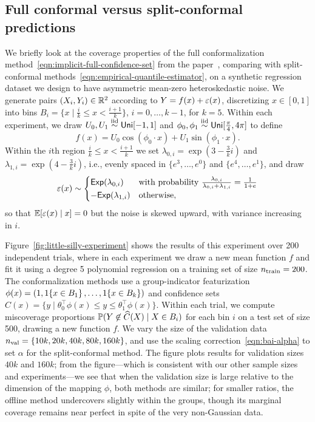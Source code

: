 \documentclass{article}
\begin{document}
\subsection{Full conformal versus split-conformal predictions}
\label{sec:offline-sin-simulation}

We briefly look at the coverage properties of the full conformalization
method~\eqref{eqn:implicit-full-confidence-set} from the
paper~\citep{GibbsChCa25}, comparing with split-conformal
methods~\eqref{eqn:empirical-quantile-estimator}, on a synthetic regression
dataset we design to have asymmetric mean-zero heteroskedastic noise.
%
We generate pairs $(X_i, Y_i) \in \mathbb{R}^2$ according to
$Y = f(x) + \varepsilon(x)$,
discretizing $x \in [0, 1]$ into bins
$B_i = \{x \mid \frac{i}{k} \le x < \frac{i + 1}{k}\}$,
$i = 0, \ldots, k - 1$, for $k = 5$.
%
Within each experiment, we
draw $U_0, U_1 \stackrel{\rm iid}{\sim} \mathsf{Uni}[-1, 1]$ and
$\phi_0, \phi_1 \stackrel{\rm iid}{\sim} \mathsf{Uni}[\frac{\pi}{4}, 4 \pi]$
to define
\begin{equation*}
  f(x) = U_0 \cos(\phi_0 \cdot x)
  + U_1 \sin(\phi_1 \cdot x).
\end{equation*}
Within the $i$th region $\frac{i}{k} \le x < \frac{i + 1}{k}$ we
set $\lambda_{0,i} = \exp(3 - \frac{3}{k} i)$ and
$\lambda_{1,i} = \exp(4 - \frac{3}{k} i)$, i.e.,
evenly spaced in $\{e^{3}, \ldots, e^0\}$ and $\{e^{4}, \ldots, e^{1}\}$,
and draw
\begin{equation*}
  \varepsilon(x) \sim \begin{cases} \mathsf{Exp}(\lambda_{0,i})
    & \mbox{with probability}~
    \frac{\lambda_{0,i}}{\lambda_{0,i} + \lambda_{1,i}}
    = \frac{1}{1 + e} \\
    -\mathsf{Exp}(\lambda_{1,i})
    & \mbox{otherwise},
  \end{cases}
\end{equation*}
so that $\mathbb{E}[\varepsilon(x) \mid x] = 0$ but the noise is skewed upward,
with variance increasing in $i$.

Figure~\ref{fig:little-silly-experiment} shows the results of this
experiment over 200 independent trials, where in each
experiment we draw a new mean function $f$ and fit it using
a degree 5 polynomial regression on a training
set of size $n_{\textup{train}} = 200$.
%
The conformalization methods use a group-indicator featurization $\phi(x) =
(1, 1\!\left\{x \in B_1\right\}, \ldots, 1\!\left\{x \in B_k\right\})$ and confidence sets
$C(x) = \{y \mid \theta_0^\top \phi(x) \le y \le \theta_1^\top
\phi(x)\}$.
%
Within each trial, we compute miscoverage
proportions $\mathbb{P}(Y \not \in \widehat{C}(X) \mid X \in B_i)$ for each bin $i$ on
a test set of size 500, drawing a new function $f$.
%
We vary the size of the validation data $n_{\textup{val}}
= \{10 k, 20k, 40k, 80k, 160k\}$, and
use the scaling correction~\eqref{eqn:bai-alpha} to set $\alpha$ for
the split-conformal method.
%
The figure plots results for validation sizes $40k$ and $160k$; from the
figure---which is consistent with our other sample sizes and
experiments---we see that when the validation size is large relative to the
dimension of the mapping $\phi$, both methods are similar; for smaller
ratios, the offline method undercovers slightly within the groups, though
its marginal coverage remains near perfect in spite of the very non-Gaussian
data.
\end{document}
